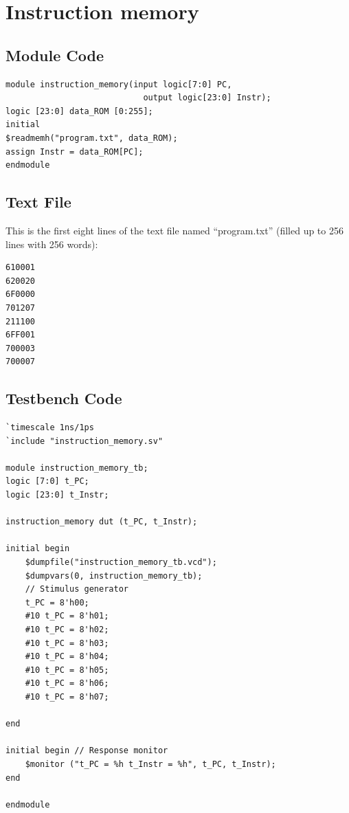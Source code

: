 \documentclass{article}
\begin{document}
\newpage
\section{Instruction memory}

\subsection{Module Code}
\begin{lstlisting}
module instruction_memory(input logic[7:0] PC,
                            output logic[23:0] Instr);
logic [23:0] data_ROM [0:255];
initial
$readmemh("program.txt", data_ROM); 
assign Instr = data_ROM[PC]; 
endmodule
\end{lstlisting}

\subsection{Text File}
This is the first eight lines of the text file named ``program.txt'' (filled up to 256 lines with 256 words):
\begin{Verbatim}
610001
620020
6F0000
701207
211100
6FF001
700003
700007
\end{Verbatim}

\subsection{Testbench Code}
\begin{lstlisting}
`timescale 1ns/1ps 
`include "instruction_memory.sv"

module instruction_memory_tb;
logic [7:0] t_PC;
logic [23:0] t_Instr;

instruction_memory dut (t_PC, t_Instr);

initial begin
    $dumpfile("instruction_memory_tb.vcd"); 
    $dumpvars(0, instruction_memory_tb);
    // Stimulus generator
    t_PC = 8'h00; 
    #10 t_PC = 8'h01;
    #10 t_PC = 8'h02;
    #10 t_PC = 8'h03;
    #10 t_PC = 8'h04;
    #10 t_PC = 8'h05;
    #10 t_PC = 8'h06;
    #10 t_PC = 8'h07;
    
end

initial begin // Response monitor
    $monitor ("t_PC = %h t_Instr = %h", t_PC, t_Instr);
end

endmodule
\end{lstlisting}
\end{document}
